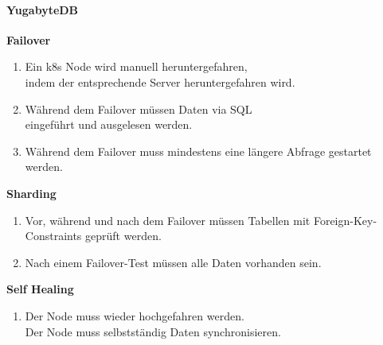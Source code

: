 \begin{flushleft}
    \paragraph{YugabyteDB}
    \begin{description}
        \item \textbf{Failover}\hfill \\
        \begin{enumerate}
            \item Ein k8s Node wird manuell heruntergefahren,\\indem der entsprechende Server heruntergefahren wird.
            \item Während dem Failover müssen Daten via SQL\\eingeführt und ausgelesen werden.
            \item Während dem Failover muss mindestens eine längere Abfrage gestartet werden.
        \end{enumerate}
        \item \textbf{Sharding}\hfill \\
        \begin{enumerate}[resume]
            \item Vor, während und nach dem Failover müssen Tabellen mit Foreign-Key-Constraints geprüft werden.
            \item Nach einem Failover-Test müssen alle Daten vorhanden sein.
        \end{enumerate}
        \item \textbf{Self Healing}\hfill \\
        \begin{enumerate}[resume]
            \item Der Node muss wieder hochgefahren werden.\\Der Node muss selbstständig Daten synchronisieren.
        \end{enumerate}
    \end{description}

\end{flushleft}
